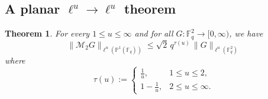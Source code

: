 \documentclass[11pt]{article}
\newtheorem{theorem}{Theorem}[section]
\newcommand{\1}{\mathbf 1}
\begin{document}
\subsection{A planar $\ell^u\to\ell^u$ theorem}



\begin{theorem}
\label{thm:planar-all-u}
For every $1\le u\le\infty$ and for all $G:\mathbb{F}_q^2\to[0,\infty)$, we have 
\[
\|\mathcal{M}_{2}G\|_{\ell^u(\mathbb{P}^1(\mathbb{F}_q))}
\le \sqrt{2}
\,q^{\tau(u)}\,\|G\|_{\ell^u(\mathbb{F}_q^2)}
\]
where
\[
\tau(u):=
\begin{cases}
\displaystyle \frac1u, & 1\le u\le 2,\\[0.4em]
\displaystyle 1-\frac1u, & 2\le u\le \infty.
\end{cases}
\]
\end{theorem}
\end{document}
